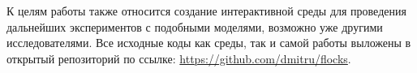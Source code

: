 К целям работы также относится создание интерактивной среды для проведения дальнейших экспериментов с подобными моделями, возможно уже другими исследователями. Все исходные коды как среды, так и самой работы выложены в открытый репозиторий по ссылке:
\url{https://github.com/dmitru/flocks}.

\clearpage